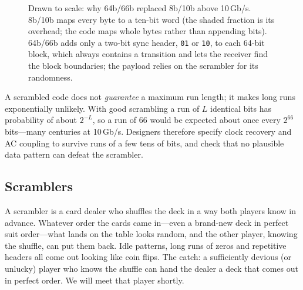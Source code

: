 \begin{figure}[htbp]\centering
{}
\caption{Drawn to scale: why 64b/66b replaced 8b/10b above 10\,Gb/s. 8b/10b maps every byte to a
ten-bit word (the shaded fraction is its overhead; the code maps whole bytes rather than
appending bits). 64b/66b adds only a two-bit sync header, \texttt{01} or \texttt{10}, to each
64-bit block, which always contains a transition and lets the receiver find the block
boundaries; the payload relies on the scrambler for its randomness.}
\label{fig:ch08_6466}
\end{figure}

A scrambled code does not \emph{guarantee} a maximum run length; it makes long runs
exponentially unlikely. With good scrambling a run of $L$ identical bits has probability of
about $2^{-L}$, so a run of 66 would be expected about once every $2^{66}$ bits---many
centuries at 10\,Gb/s. Designers therefore specify clock recovery and AC coupling to survive
runs of a few tens of bits, and check that no plausible data pattern can defeat the scrambler.

\subsection{Scramblers}
\label{sec:ch08:scramblers}

\begin{analogy}
A scrambler is a card dealer who shuffles the deck in a way both players know in advance.
Whatever order the cards came in---even a brand-new deck in perfect suit order---what lands
on the table looks random, and the other player, knowing the shuffle, can put them back.
Idle patterns, long runs of zeros and repetitive headers all come out looking like coin flips.
The catch: a sufficiently devious (or unlucky) player who knows the shuffle can hand the
dealer a deck that comes out in perfect order. We will meet that player shortly.
\end{analogy}

